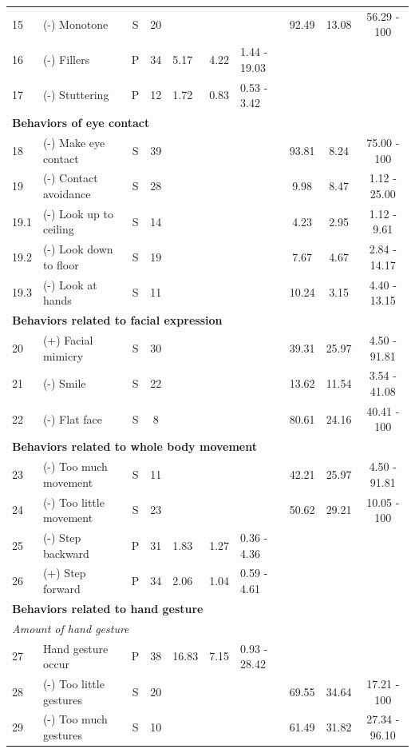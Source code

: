 \begin{table}[]
{\begin{tabular}{llcclllccc}
15 & (-) Monotone & S & 20 &  &  &  & 92.49 & 13.08 & 56.29 - 100 \\
16 & (-) Fillers & P & 34 & 5.17 & 4.22 & 1.44 - 19.03 &  &  &  \\
17 & (-) Stuttering & P & 12 & 1.72 & 0.83 & 0.53 - 3.42 &  &  &  \\ \hline
\multicolumn{10}{l}{\textbf{Behaviors of eye contact}} \\
18 & (-) Make eye contact & S & 39 &  &  &  & 93.81 & 8.24 & 75.00 - 100 \\
19 & (-) Contact avoidance & S & 28 &  &  &  & 9.98 & 8.47 & 1.12 - 25.00 \\
19.1 & (-) Look up to ceiling & S & 14 &  &  &  & 4.23 & 2.95 & 1.12 - 9.61 \\
19.2 & (-) Look down to floor & S & 19 &  &  &  & 7.67 & 4.67 & 2.84 - 14.17 \\
19.3 & (-) Look at hands & S & 11 &  &  &  & 10.24 & 3.15 & 4.40 - 13.15 \\ \hline
\multicolumn{10}{l}{\textbf{Behaviors related to facial expression}} \\
20 & (+) Facial mimicry & S & 30 &  &  &  & 39.31 & 25.97 & 4.50 - 91.81 \\
21 & (-) Smile & S & 22 &  &  &  & 13.62 & 11.54 & 3.54 - 41.08 \\
22 & (-) Flat face & S & 8 &  &  &  & 80.61 & 24.16 & 40.41 - 100 \\ \hline
\multicolumn{10}{l}{\textbf{Behaviors related to whole body movement}} \\
23 & (-) Too much movement & S & 11 &  &  &  & 42.21 & 25.97 & 4.50 - 91.81 \\
24 & (-) Too little movement & S & 23 &  &  &  & 50.62 & 29.21 & 10.05 - 100 \\
25 & (-) Step backward & P & 31 & 1.83 & 1.27 & 0.36 - 4.36 &  &  &  \\
26 & (+) Step forward & P & 34 & 2.06 & 1.04 & 0.59 - 4.61 &  &  &  \\ \hline
\multicolumn{10}{l}{\textbf{Behaviors related to hand gesture}} \\
\multicolumn{10}{l}{\textit{Amount of hand gesture}} \\
27 & Hand gesture occur & P & 38 & 16.83 & 7.15 & 0.93 - 28.42 &  &  &  \\
28 & (-) Too little gestures & S & 20 &  &  &  & 69.55 & 34.64 & 17.21 - 100 \\
29 & (-) Too much gestures & S & 10 &  &  &  & 61.49 & 31.82 & 27.34 - 96.10 \\ \hline

\end{tabular}}
\end{table}
